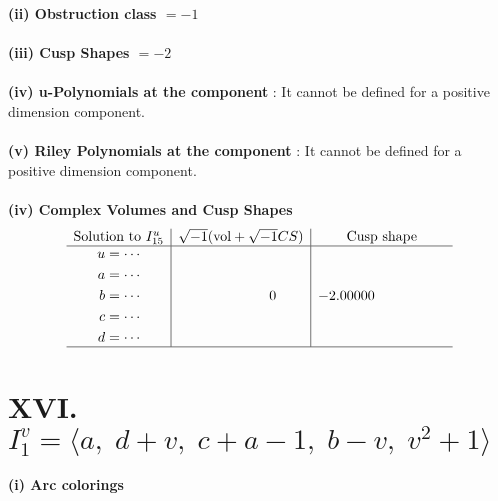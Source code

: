 \documentclass[1p]{elsarticle_modified}
\theoremstyle{definition}
\newcommand{\I}{\sqrt{-1}}
\begin{document}
\flushleft \textbf{(ii) Obstruction class $= -1$}\\~\\
\flushleft \textbf{(iii) Cusp Shapes $= -2$}\\~\\
\flushleft \textbf{(iv) u-Polynomials at the component} : It cannot be defined for a positive dimension component.\\~\\
\flushleft \textbf{(v) Riley Polynomials at the component} : It cannot be defined for a positive dimension component.\\~\\
\newpage\flushleft \textbf{(iv) Complex Volumes and Cusp Shapes}
$$\begin{array}{c|c|c} 
\text{Solution to }I^u_{15}& \I (\text{vol} + \sqrt{-1}CS) & \text{Cusp shape}\\
 \hline 
\begin{aligned}
u &= \cdots \\
a &= \cdots \\
b &= \cdots \\
c &= \cdots \\
d &= \cdots\end{aligned}
 & \phantom{-0.000000 } 0 & -2.00000\phantom{ +0.000000I}\\
 \hline 
 \end{array}
$$\newpage\renewcommand{\arraystretch}{1}
\centering \section*{XVI. $I^v_{1}= \langle a,\;d+v,\;c+a-1,\;b- v,\;v^2+1 \rangle$}
\flushleft \textbf{(i) Arc colorings}\\
\end{document}
